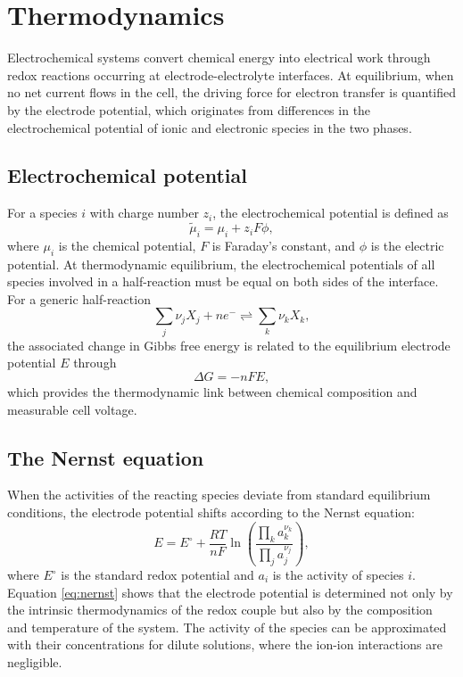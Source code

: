 \section{Thermodynamics}

Electrochemical systems convert chemical energy into electrical work through redox reactions occurring at electrode-electrolyte interfaces. 
At equilibrium, when no net current flows in the cell, the driving force for electron transfer is quantified by the electrode potential, which originates from differences in the electrochemical potential of ionic and electronic species in the two phases.

\subsection{Electrochemical potential}

For a species $i$ with charge number $z_i$, the electrochemical potential is defined as
\begin{equation}
    \tilde{\mu}_i = \mu_i + z_i F \phi,
\end{equation}
where $\mu_i$ is the chemical potential, $F$ is Faraday's constant, and $\phi$ is the electric potential.
At thermodynamic equilibrium, the electrochemical potentials of all species involved in a half-reaction must be equal on both sides of the interface. 
For a generic half-reaction
\[
\sum_j \nu_j X_j + n e^- \rightleftharpoons \sum_k \nu_k X_k,
\]
the associated change in Gibbs free energy is related to the equilibrium electrode potential $E$ through
\begin{equation}
    \Delta G = -n F E,
\end{equation}
which provides the thermodynamic link between chemical composition and measurable cell voltage.

\subsection{The Nernst equation}
\label{sec:Nernst}

When the activities of the reacting species deviate from standard equilibrium conditions, the electrode potential shifts according to the Nernst equation:
\begin{equation}
    E = E^\circ + \frac{RT}{nF}
    \ln\left(
        \frac{\prod_k a_k^{\nu_k}}{\prod_j a_j^{\nu_j}}
    \right),
    \label{eq:nernst}
\end{equation}
where $E^\circ$ is the standard redox potential and $a_i$ is the activity of species $i$. Equation \ref{eq:nernst} shows that the electrode potential is determined not only by the intrinsic thermodynamics of the redox couple but also by the composition and temperature of the system.
The activity of the species can be approximated with their concentrations for dilute solutions, where the ion-ion interactions are negligible.

